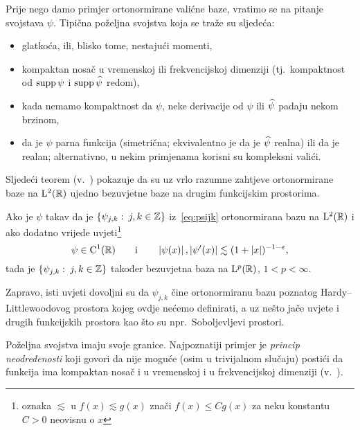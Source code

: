 \documentclass[main.tex]{subfiles}
\newcommand{\mr}[1]{\mathrm{#1}}
\begin{document}
Prije nego damo primjer ortonormirane valićne baze,
vratimo se na pitanje svojstava \( \psi \).
Tipična poželjna svojstva koja se traže su sljedeća:
\begin{itemize}
	\item glatkoća, ili, blisko tome, nestajući momenti,
	\item kompaktan nosač u vremenskoj ili frekvencijskoj dimenziji (tj.\ kompaktnost od \( \operatorname{supp} \psi \) i \( \operatorname{supp} \widehat{\psi} \) redom),
	\item kada nemamo kompaktnost da \( \psi \), neke derivacije od \( \psi \) ili \( \widehat{\psi} \) padaju nekom brzinom,
	\item da je \( \psi  \) parna funkcija (simetrična; ekvivalentno je da je \( \widehat{\psi} \) realna) ili da je
	      realan; alternativno, u nekim primjenama korisni su kompleksni valići.
\end{itemize}
Sljedeći teorem (v.~\cite[]{daub}) pokazuje da su uz vrlo razumne zahtjeve ortonormirane baze na
\( \mathrm{L}^2(\mathbb{R}) \) ujedno bezuvjetne baze na drugim funkcijskim prostorima.

\newcommand{\fusnota}{\footnote{oznaka \( \lesssim \) u \( f(x) \lesssim g(x) \) znači \( f(x) \le Cg(x) \) za neku konstantu \( C > 0 \) neovisnu o \( x \)}}
\begin{teorem} \label{bezbazaLp}
	Ako je \( \psi \) takav da je \( \left\{ \psi_{j,k} \, \colon \, j,k \in \mathbb{Z} \right\} \) iz~\eqref{eq:psijk} ortonormirana bazu na \( \mathrm{L}^2(\mathbb{R}) \) i ako dodatno vrijede uvjeti\fusnota
	\begin{equation} \label{dovuvjetipsi}
		\psi \in \mr C^1(\R) \qquad \mathrm i \qquad \abs{\psi(x)}, \abs{\psi'(x)} \lesssim (1 + \abs x)^{-1-\varepsilon},
	\end{equation}
	tada je \( \left\{ \psi_{j,k} \, \colon \, j,k \in \mathbb Z \right\} \) također bezuvjetna baza na \( \mathrm{L}^p(\mathbb{R}) \), \( 1 < p < \infty \).
\end{teorem}
Zapravo, isti uvjeti dovoljni su da \( \psi_{j,k} \) čine ortonormiranu bazu poznatog Hardy--Littlewoodovog
prostora kojeg ovdje nećemo definirati, a uz nešto jače uvjete i drugih funkcijskih prostora kao što
su npr.\ Soboljevljevi prostori.

Poželjna svojstva imaju svoje granice. Najpoznatiji
primjer je \emph{princip neodređenosti} koji govori
da nije moguće (osim u trivijalnom slučaju)
postići da funkcija ima kompaktan nosač i u
vremenskoj i u frekvencijskoj dimenziji (v.~\cite[theorem~4]{kovac-wroclaw}).
\end{document}
